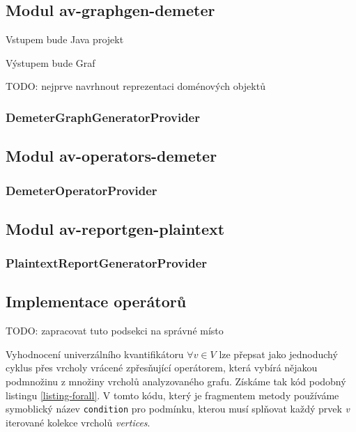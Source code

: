 \subsection{Modul av-graphgen-demeter}


Vstupem bude Java projekt

Výstupem bude Graf

TODO: nejprve navrhnout reprezentaci doménových objektů

\subsubsection{DemeterGraphGeneratorProvider}

\subsection{Modul av-operators-demeter}
\subsubsection{DemeterOperatorProvider}

\subsection{Modul av-reportgen-plaintext}
\subsubsection{PlaintextReportGeneratorProvider}


\subsection{Implementace operátorů}
TODO: zapracovat tuto podsekci na správné místo

Vyhodnocení univerzálního kvantifikátoru $\forall v \in V$ lze přepsat jako jednoduchý cyklus přes vrcholy vrácené zpřesňující operátorem, která vybírá nějakou podmnožinu z množiny vrcholů analyzovaného grafu. Získáme tak kód podobný listingu \ref{listing-forall}. V tomto kódu, který je fragmentem metody používáme symoblický název \verb+condition+ pro podmínku, kterou musí splňovat každý prvek \emph{v} iterované kolekce vrcholů \emph{vertices}.


